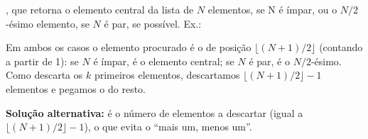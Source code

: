 {{\begin{Qlist}
\begin{solution}
        \end{solution}

        \item[(c)] , que retorna o elemento central da lista de
            $N$ elementos, se N é ímpar, ou o $N/2$-ésimo elemento, se $N$ é par, se possível. Ex.: 


        \begin{solution}
        Em ambos os casos o elemento procurado é o de posição $\lfloor (N+1)/2\rfloor$
        (contando a partir de 1): se $N$ é ímpar, é o elemento central; se $N$ é par, é o
        $N/2$-ésimo. Como  descarta os $k$ primeiros elementos, descartamos
        $\lfloor (N+1)/2\rfloor - 1$ elementos e pegamos o  do resto.


        \textbf{Solução alternativa:}  é o número de elementos a descartar (igual a $\lfloor (N+1)/2\rfloor - 1$), o que evita o ``mais um, menos um''.

        \end{solution}
    \end{Qlist}
} }

